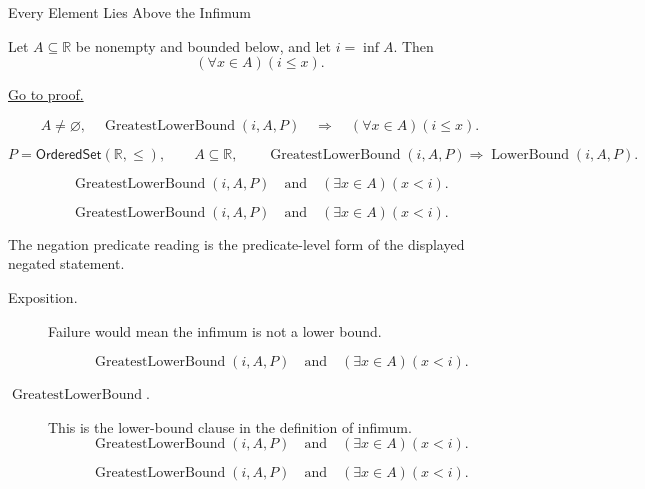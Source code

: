 \begin{propositionbox}{Every Element Lies Above the Infimum}
\begin{proposition}
\label{prop:every-element-lies-above-the-infimum}
Let $A\subseteq\mathbb{R}$ be nonempty and bounded below, and let
$i=\inf A$. Then
\[
  (\forall x\in A)(i\leq x).
\]

\hyperref[prf:every-element-lies-above-the-infimum]{Go to proof.}
\end{proposition}
\end{propositionbox}

\begin{remark*}
\[
  A\neq\varnothing,\quad \operatorname{GreatestLowerBound}(i,A,P)
  \quad\Longrightarrow\quad
  (\forall x\in A)(i\leq x).
\]
\end{remark*}

\begin{remark*}
\[
  P=\mathsf{OrderedSet}(\mathbb{R},\leq),\qquad A\subseteq\mathbb{R},\qquad
  \operatorname{GreatestLowerBound}(i,A,P)\Longrightarrow \operatorname{LowerBound}(i,A,P).
\]
\end{remark*}

\begin{remark*}
\[
  \operatorname{GreatestLowerBound}(i,A,P)\quad\text{and}\quad(\exists x\in A)(x<i).
\]
\end{remark*}

\begin{remark*}
\[
  \operatorname{GreatestLowerBound}(i,A,P)\quad\text{and}\quad(\exists x\in A)(x<i).
\]

The negation predicate reading is the predicate-level form of the displayed negated statement.
\end{remark*}

\begin{remark*}
\begin{description}
  \item[Exposition.]
  Failure would mean the infimum is not a lower bound.

  
\[
  \operatorname{GreatestLowerBound}(i,A,P)\quad\text{and}\quad(\exists x\in A)(x<i).
\]
  \item[\(\operatorname{GreatestLowerBound}.\)]
  This is the lower-bound clause in the definition of infimum.
  \[
    \operatorname{GreatestLowerBound}(i,A,P)\quad\text{and}\quad(\exists x\in A)(x<i).
  \]

\[
    \operatorname{GreatestLowerBound}(i,A,P)\quad\text{and}\quad(\exists x\in A)(x<i).
  \]
\end{description}
\end{remark*}

